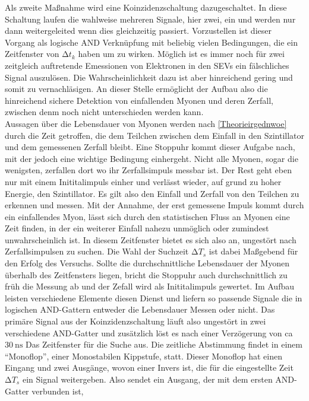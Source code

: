 Als zweite Maßnahme wird eine Koinzidenzschaltung dazugeschaltet. In diese Schaltung laufen die wahlweise mehreren Signale, hier zwei, ein und werden nur dann weitergeleited wenn dies gleichzeitig passiert.
Vorzustellen ist dieser Vorgang als logische AND Verknüpfung mit beliebig vielen Bedingungen, die ein Zeitfenster von $\increment t_k$ haben um zu wirken. 
Möglich ist es immer noch für zwei zeitgleich auftretende Emessionen von Elektronen in den SEVs ein fälschliches Signal auszulösen. Die Wahrscheinlichkeit dazu ist aber hinreichend gering
und somit zu vernachläsigen. An dieser Stelle ermöglicht der Aufbau also die hinreichend sichere Detektion von einfallenden Myonen und deren Zerfall, zwischen denm noch nicht unterschieden werden kann. 
\\
\newline
Aussagen über die Lebensdauer von Myonen werden nach \ref{Theorieirgednwoe} durch die Zeit getroffen, die dem Teilchen zwischen dem Einfall in den Szintillator und dem gemessenen 
Zerfall bleibt. Eine Stoppuhr kommt dieser Aufgabe nach, mit der jedoch eine wichtige Bedingung einhergeht. 
Nicht alle Myonen, sogar die wenigsten, zerfallen dort wo ihr Zerfallsimpuls messbar ist. Der Rest geht eben nur mit einem Inititalimpuls einher und verlässt wieder, auf grund zu hoher Energie, den Szintillator.
Es gilt also den Einfall und Zerfall von den Teilchen zu erkennen und messen. Mit der Annahme, der erst gemessene Impuls kommt durch ein einfallendes 
Myon, lässt sich durch den statistischen Fluss an Myonen eine Zeit finden, in der ein weiterer Einfall nahezu unmöglich oder zumindest unwahrscheinlich ist.
In diesem Zeitfenster bietet es sich also an, ungestört nach Zerfallsimpulsen zu suchen. Die Wahl der Suchzeit $\increment T_s$
ist dabei Maßgebend für den Erfolg des Versuchs. Sollte die durchschnittliche Lebensdauer der Myonen überhalb des Zeitfensters liegen, 
bricht die Stoppuhr auch durchschnittlich zu früh die Messung ab und der Zefall wird als Inititalimpuls gewertet. 
Im Aufbau leisten verschiedene Elemente diesen Dienst und liefern so passende Signale die in logischen AND-Gattern entweder die Lebensdauer Messen oder nicht.
Das primäre Signal aus der Koinzidenzschaltung läuft also ungestört in zwei verschiedene AND-Gatter und zusätzlich löst es nach einer Verzögerung von ca $\SI{30}{\nano\second}$
Das Zeitfenster für die Suche aus.
Die zeitliche Abstimmung findet in einem \enquote{Monoflop}, einer Monostabilen Kippstufe, statt. Dieser Monoflop
hat einen Eingang und zwei Ausgänge, wovon einer Invers ist, die für die eingestellte Zeit $\increment T_s$ ein Signal weitergeben. Also sendet ein Ausgang, der mit dem ersten AND-Gatter verbunden ist,
